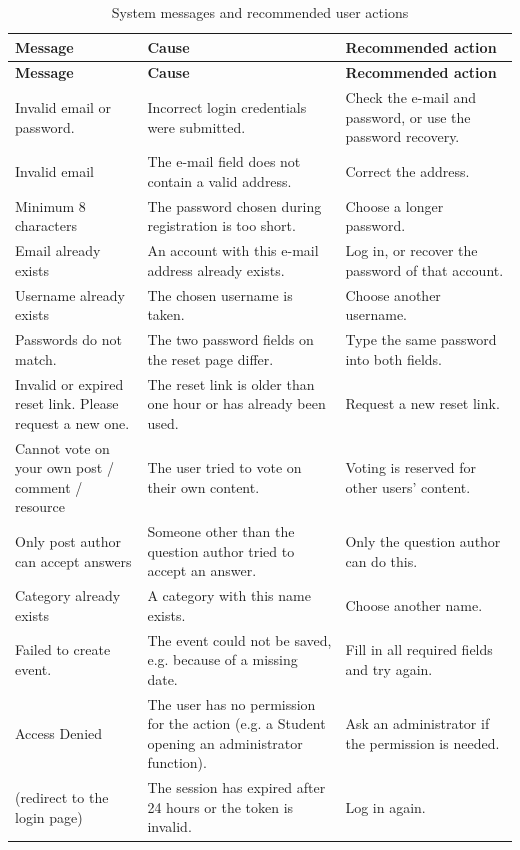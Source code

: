 \begin{longtable}{@{}>{\raggedright\arraybackslash}p{} >{\raggedright\arraybackslash}p{} >{\raggedright\arraybackslash}p{}@{}}
  \toprule
  \textbf{Message} & \textbf{Cause} & \textbf{Recommended action} \\
  \midrule
  \endfirsthead
  \toprule
  \textbf{Message} & \textbf{Cause} & \textbf{Recommended action} \\
  \midrule
  \endhead
  \bottomrule
  \endfoot
  \bottomrule
  \caption{System messages and recommended user actions}
  \label{tab:messages}
  \endlastfoot
  Invalid email or password. & Incorrect login credentials were submitted. &
    Check the e-mail and password, or use the password recovery. \\
  Invalid email & The e-mail field does not contain a valid address. &
    Correct the address. \\
  Minimum 8 characters & The password chosen during registration is too short. &
    Choose a longer password. \\
  Email already exists & An account with this e-mail address already exists. &
    Log in, or recover the password of that account. \\
  Username already exists & The chosen username is taken. & Choose another username. \\
  Passwords do not match. & The two password fields on the reset page differ. &
    Type the same password into both fields. \\
  Invalid or expired reset link. Please request a new one. & The reset link is older
    than one hour or has already been used. & Request a new reset link. \\
  Cannot vote on your own post / comment / resource & The user tried to vote on their
    own content. & Voting is reserved for other users' content. \\
  Only post author can accept answers & Someone other than the question author tried to
    accept an answer. & Only the question author can do this. \\
  Category already exists & A category with this name exists. & Choose another name. \\
  Failed to create event. & The event could not be saved, e.g. because of a missing
    date. & Fill in all required fields and try again. \\
  Access Denied & The user has no permission for the action (e.g. a Student opening an
    administrator function). & Ask an administrator if the permission is needed. \\
  (redirect to the login page) & The session has expired after 24 hours or the token is
    invalid. & Log in again. \\
\end{longtable}

